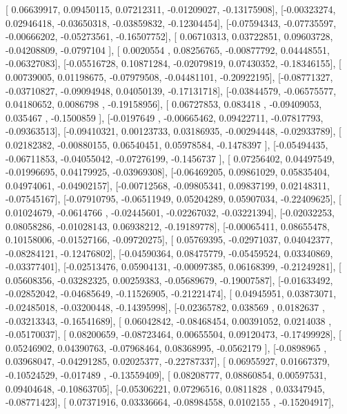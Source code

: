 \documentclass{article}
\begin{document}
       [ 0.06639917,  0.09450115,  0.07212311, -0.01209027, -0.13175908],
       [-0.00323274,  0.02946418, -0.03650318, -0.03859832, -0.12304454],
       [-0.07594343, -0.07735597, -0.00666202, -0.05273561, -0.16507752],
       [ 0.06710313,  0.03722851,  0.09603728, -0.04208809, -0.0797104 ],
       [ 0.0020554 ,  0.08256765, -0.00877792,  0.04448551, -0.06327083],
       [-0.05516728,  0.10871284, -0.02079819,  0.07430352, -0.18346155],
       [ 0.00739005,  0.01198675, -0.07979508, -0.04481101, -0.20922195],
       [-0.08771327, -0.03710827, -0.09094948,  0.04050139, -0.17131718],
       [-0.03844579, -0.06575577,  0.04180652,  0.0086798 , -0.19158956],
       [ 0.06727853,  0.083418  , -0.09409053,  0.035467  , -0.1500859 ],
       [-0.0197649 , -0.00665462,  0.09422711, -0.07817793, -0.09363513],
       [-0.09410321,  0.00123733,  0.03186935, -0.00294448, -0.02933789],
       [ 0.02182382, -0.00880155,  0.06540451,  0.05978584, -0.1478397 ],
       [-0.05494435, -0.06711853, -0.04055042, -0.07276199, -0.1456737 ],
       [ 0.07256402,  0.04497549, -0.01996695,  0.04179925, -0.03969308],
       [-0.06469205,  0.09861029,  0.05835404,  0.04974061, -0.04902157],
       [-0.00712568, -0.09805341,  0.09837199,  0.02148311, -0.07545167],
       [-0.07910795, -0.06511949,  0.05204289,  0.05907034, -0.22409625],
       [ 0.01024679, -0.0614766 , -0.02445601, -0.02267032, -0.03221394],
       [-0.02032253,  0.08058286, -0.01028143,  0.06938212, -0.19189778],
       [-0.00065411,  0.08655478,  0.10158006, -0.01527166, -0.09720275],
       [ 0.05769395, -0.02971037,  0.04042377, -0.08284121, -0.12476802],
       [-0.04590364,  0.08475779, -0.05459524,  0.03340869, -0.03377401],
       [-0.02513476,  0.05904131, -0.00097385,  0.06168399, -0.21249281],
       [ 0.05608356, -0.03282325,  0.00259383, -0.05689679, -0.19007587],
       [-0.01633492, -0.02852042, -0.04685649, -0.11526905, -0.21221474],
       [ 0.04945951,  0.03873071, -0.02485018, -0.03200448, -0.14395998],
       [-0.02365782,  0.038569  ,  0.0182637 , -0.03213343, -0.16541689],
       [ 0.06042842, -0.08468454,  0.00391052,  0.0214038 , -0.05170037],
       [ 0.08200659, -0.08723464,  0.00655504,  0.09120473, -0.17499928],
       [ 0.05246902,  0.04390763, -0.07968464,  0.08368995, -0.0562179 ],
       [-0.0898965 ,  0.03968047, -0.04291285,  0.02025377, -0.22787337],
       [ 0.06955927,  0.01667379, -0.10524529, -0.017489  , -0.13559409],
       [ 0.08208777,  0.08860854,  0.00597531,  0.09404648, -0.10863705],
       [-0.05306221,  0.07296516,  0.0811828 ,  0.03347945, -0.08771423],
       [ 0.07371916,  0.03336664, -0.08984558,  0.0102155 , -0.15204917],
\end{document}
